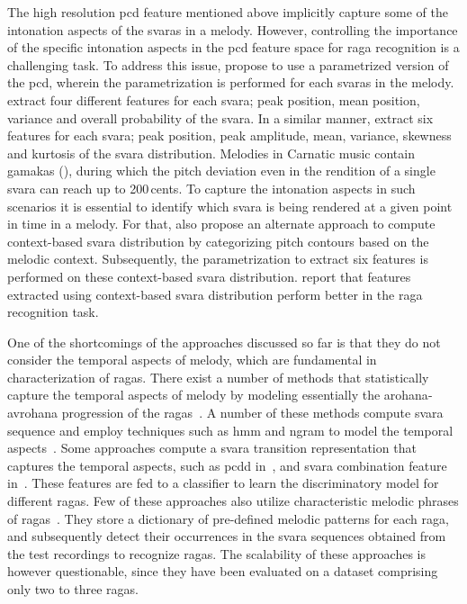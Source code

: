 The high resolution \gls{pcd} feature mentioned above implicitly capture some of the intonation aspects of the \glspl{svara} in a melody. However, controlling the importance of the  specific intonation aspects in the \gls{pcd} feature space for \gls{raga} recognition is a challenging task. To address this issue, \cite{belle2009raga,koduri2014intonation} propose to use a parametrized version of the \gls{pcd}, wherein the parametrization is performed for each \glspl{svara} in the melody. \cite{belle2009raga} extract four different features for each \gls{svara}; peak position, mean position, variance and overall probability of the \gls{svara}.  In a similar manner, \cite{koduri2014intonation} extract six features for each \gls{svara}; peak position, peak amplitude, mean, variance, skewness and kurtosis of the \gls{svara} distribution. Melodies in Carnatic music contain \glspl{gamaka} (), during which the pitch deviation even in the rendition of a single \gls{svara} can reach up to 200\,cents. To capture the intonation aspects in such scenarios it is essential to identify which \gls{svara} is being rendered at a given point in time in a melody. For that, \cite{koduri2014intonation} also propose an alternate approach to compute context-based \gls{svara} distribution by categorizing pitch contours based on the melodic context. Subsequently, the parametrization to extract six features is performed on these context-based \gls{svara} distribution. \cite{koduri2014intonation} report that features extracted using context-based \gls{svara} distribution perform better in the \gls{raga} recognition task.

One of the shortcomings of the approaches discussed so far is that they do not consider the temporal aspects of melody, which are fundamental in characterization of \glspl{raga}. There exist  a number of methods that statistically capture the temporal aspects of melody by modeling essentially the \gls{arohana}-\gls{avrohana} progression of the \glspl{raga}~\citep{pandey2003tansen,chordia2007raag,Shetty2009,sridhar2009raga,dighe2013scale,kumar2014identifying}. A number of these methods compute \gls{svara} sequence and employ techniques such as \gls{hmm} and \acrshort{ngram} to model the temporal aspects~\citep{pandey2003tansen,dighe2013scale,kumar2014identifying}. Some approaches compute a \gls{svara} transition representation that captures the temporal aspects, such as \gls{pcdd} in~\cite{chordia2007raag}, and \gls{svara} combination feature in~\cite{Shetty2009}. These features are fed to a classifier to learn the discriminatory model for different \glspl{raga}. Few of these approaches also utilize characteristic melodic phrases of \glspl{raga}~\citep{pandey2003tansen,sridhar2009raga}. They store a dictionary of pre-defined melodic patterns for each \gls{raga}, and subsequently detect their occurrences in the \gls{svara} sequences obtained from the test recordings to recognize \glspl{raga}. The scalability of these approaches is however questionable, since they have been evaluated on a dataset comprising only two to three \glspl{raga}. 

